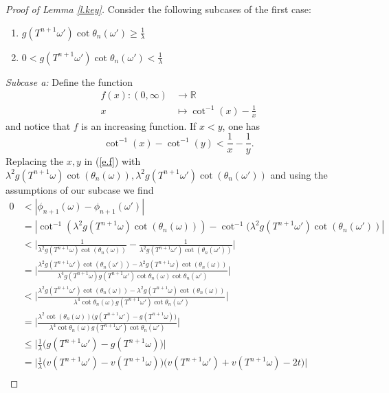\documentclass{amsart}
\newcommand{\RR}{\mathbb{R}}
\begin{document}
\begin{proof}[Proof of Lemma \ref{l.key}]
    Consider the following subcases of the first case:
    \begin{enumerate}
        \item[(a)] $g(T^{n+1}\omega')\cot\theta_{n}(\omega') \geq \frac{1}{\lambda}$
        \item[(b)] $0 < g(T^{n+1}\omega')\cot\theta_{n}(\omega') < \frac{1}{\lambda}$
    \end{enumerate}
    \textit{Subcase a:} Define the function 
    \begin{align*}
        f(x):(0, \infty) &\rightarrow \RR\\
        x &\mapsto \cot^{-1}(x) - \frac{1}{x}
    \end{align*}
    and notice that $f$ is an increasing function. If $x<y$, one has 
    \begin{equation}\label{e.f}
        \cot^{-1}(x) - \cot^{-1}(y) < \frac{1}{x} - \frac{1}{y}.
    \end{equation}
    Replacing the $x,y$ in (\ref{e.f}) with $\lambda^2g(T^{n+1}\omega)\cot(\theta_{n}(\omega)), \lambda^2 g(T^{n+1}\omega')\cot(\theta_{n}(\omega'))$ and using the assumptions of our subcase we find
    \begin{align*}
        0 &< |\phi_{n+1}(\omega) - \phi_{n+1}(\omega')| \\
        &= |\cot^{-1}(\lambda^2g(T^{n+1}\omega)\cot(\theta_{n}(\omega))) -\cot^{-1}(\lambda^2g(T^{n+1}\omega')\cot(\theta_{n}(\omega'))|\\
        &< \Bigg|\frac{1}{\lambda^2g(T^{n+1}\omega)\cot(\theta_{n}(\omega))} - \frac{1}{\lambda^2g(T^{n+1}\omega')\cot(\theta_{n}(\omega'))}\Bigg|\\
        &= \Bigg|\frac{\lambda^2g(T^{n+1}\omega')\cot(\theta_{n}(\omega')) - \lambda^2g(T^{n+1}\omega)\cot(\theta_{n}(\omega))}{\lambda^4g(T^{n+1}\omega)g(T^{n+1}\omega')\cot\theta_{n}(\omega)\cot\theta_{n}(\omega')}\Bigg|\\
        &<\Bigg|\frac{\lambda^2g(T^{n+1}\omega')\cot(\theta_{n}(\omega)) - \lambda^2g(T^{n+1}\omega)\cot(\theta_{n}(\omega))}{\lambda^4 \cot\theta_{n}(\omega)g(T^{n+1}\omega')\cot\theta_{n}(\omega')}\Bigg|\\
        &= \Bigg|\frac{\lambda^2\cot(\theta_{n}(\omega))\Big(g(T^{n+1}\omega') - g(T^{n+1}\omega)\Big)}{\lambda^4 \cot\theta_{n}(\omega)g(T^{n+1}\omega')\cot\theta_{n}(\omega')}\Bigg|\\
        &\leq \Bigg|\frac{1}{\lambda} \Big(g(T^{n+1}\omega') - g(T^{n+1}\omega)\Big)\Bigg|\\
        &= \Bigg|\frac{1}{\lambda}\Big(v(T^{n+1}\omega') - v(T^{n+1}\omega)\Big) \Big(v(T^{n+1}\omega') + v(T^{n+1}\omega) - 2t\Big)\Bigg|\\

\end{align*}
\end{proof}
\end{document}
